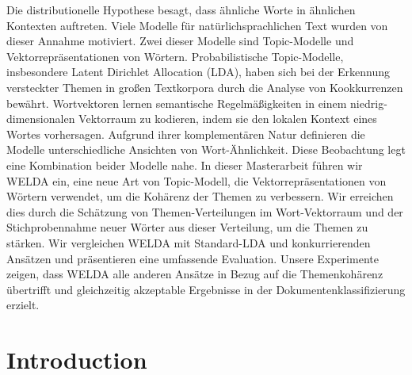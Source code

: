 \documentclass[
        a4paper,
        titlepage,
        twoside,
        parskip,
        numbers=noenddot
        ]{scrbook}
\theoremstyle{break}
\begin{document}
Die distributionelle Hypothese besagt, dass ähnliche Worte in ähnlichen Kontexten auftreten.
Viele Modelle für natürlichsprachlichen Text wurden von dieser Annahme motiviert.
Zwei dieser Modelle sind Topic-Modelle und Vektorrepräsentationen von Wör\-tern.
Probabilistische Topic-Modelle, insbesondere Latent Dirichlet Allocation (LDA), haben sich bei der Erkennung versteckter Themen in großen Textkorpora durch die Analyse von Kookkurrenzen bewährt.
Wortvektoren lernen semantische Regel\-mäßig\-keiten in einem niedrig-dimensionalen Vektorraum zu kodieren, indem sie den lokalen Kontext eines Wortes vorhersagen.
Aufgrund ihrer komplementären Natur definieren die Modelle unterschiedliche Ansichten von Wort-Ähnlichkeit.
Diese Beobachtung legt eine Kombination beider Modelle nahe.
In dieser Masterarbeit führen wir WELDA ein, eine neue Art von Topic-Modell, die Vektorrepräsentationen von Wörtern verwendet, um die Kohärenz der Themen zu verbessern.
Wir erreichen dies durch die Schätzung von Themen-Verteilungen im Wort-Vektorraum und der Stichprobennahme neuer Wörter aus dieser Verteilung, um die Themen zu stärken.
Wir vergleichen WELDA mit Standard-LDA und konkurrierenden Ansätzen und präsentieren eine umfassende Evaluation.
Unsere Experimente zeigen, dass WELDA alle anderen Ansätze in Bezug auf die Themenkohärenz übertrifft und gleichzeitig akzeptable Ergebnisse in der Dokumentenklassifizierung erzielt.

\@openrighttrue
\makeatother

\tableofcontents

\chapter{Introduction}
\label{sec:introduction}

\end{document}
